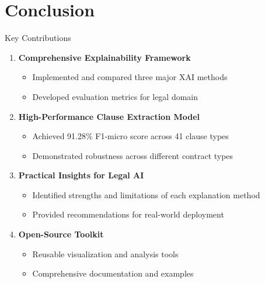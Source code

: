 
\section{Conclusion}

\begin{frame}{Key Contributions}
\begin{enumerate}
    \item \textbf{Comprehensive Explainability Framework}
    \begin{itemize}
        \item Implemented and compared three major XAI methods
        \item Developed evaluation metrics for legal domain
    \end{itemize}
    
    \item \textbf{High-Performance Clause Extraction Model}
    \begin{itemize}
        \item Achieved 91.28\% F1-micro score across 41 clause types
        \item Demonstrated robustness across different contract types
    \end{itemize}
    
    \item \textbf{Practical Insights for Legal AI}
    \begin{itemize}
        \item Identified strengths and limitations of each explanation method
        \item Provided recommendations for real-world deployment
    \end{itemize}
    
    \item \textbf{Open-Source Toolkit}
    \begin{itemize}
        \item Reusable visualization and analysis tools
        \item Comprehensive documentation and examples
    \end{itemize}
\end{enumerate}
\end{frame}

